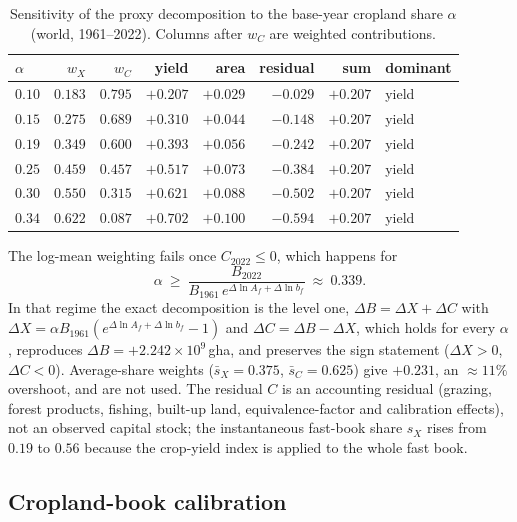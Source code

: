 \documentclass[11pt,a4paper]{article}
\begin{document}
\begin{table}[htbp]
\centering\small
\caption{Sensitivity of the proxy decomposition to the base-year cropland share $\alpha$ (world, 1961--2022). Columns after $w_C$ are weighted contributions.}
\label{tab:si_alpha}
\begin{tabular}{l r r r r r r l}
\toprule
$\alpha$ & $w_X$ & $w_C$ & yield & area & residual & sum & dominant \\
\midrule
$0.10$ & $0.183$ & $0.795$ & $+0.207$ & $+0.029$ & $-0.029$ & $+0.207$ & yield \\
$0.15$ & $0.275$ & $0.689$ & $+0.310$ & $+0.044$ & $-0.148$ & $+0.207$ & yield \\
$0.19$ & $0.349$ & $0.600$ & $+0.393$ & $+0.056$ & $-0.242$ & $+0.207$ & yield \\
$0.25$ & $0.459$ & $0.457$ & $+0.517$ & $+0.073$ & $-0.384$ & $+0.207$ & yield \\
$0.30$ & $0.550$ & $0.315$ & $+0.621$ & $+0.088$ & $-0.502$ & $+0.207$ & yield \\
$0.34$ & $0.622$ & $0.087$ & $+0.702$ & $+0.100$ & $-0.594$ & $+0.207$ & yield \\
\bottomrule
\end{tabular}
\end{table}

The log-mean weighting fails once $C_{2022}\le0$, which happens for
\begin{equation}
\alpha\ \ge\ \frac{B_{2022}}{B_{1961}\,e^{\Delta\ln A_f+\Delta\ln b_f}}\ \approx\ 0.339 .
\end{equation}
In that regime the exact decomposition is the level one, $\Delta B=\Delta X+\Delta C$ with $\Delta X=\alpha B_{1961}(e^{\Delta\ln A_f+\Delta\ln b_f}-1)$ and $\Delta C=\Delta B-\Delta X$, which holds for every $\alpha$, reproduces $\Delta B=+2.242\times10^{9}$\,gha, and preserves the sign statement ($\Delta X>0$, $\Delta C<0$). Average-share weights ($\bar s_X=0.375$, $\bar s_C=0.625$) give $+0.231$, an $\approx11\%$ overshoot, and are not used. The residual $C$ is an accounting residual (grazing, forest products, fishing, built-up land, equivalence-factor and calibration effects), not an observed capital stock; the instantaneous fast-book share $s_X$ rises from $0.19$ to $0.56$ because the crop-yield index is applied to the whole fast book.

\subsection{Cropland-book calibration}\label{si:cropland}
\end{document}
